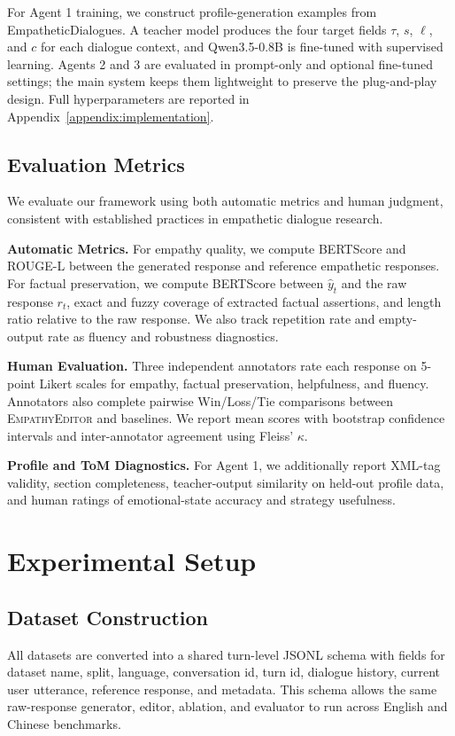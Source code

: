 \documentclass[11pt]{article}
\begin{document}
For Agent 1 training, we construct profile-generation examples from EmpatheticDialogues. A teacher model produces the four target fields $\tau$, $s$, $\ell$, and $c$ for each dialogue context, and Qwen3.5-0.8B is fine-tuned with supervised learning. Agents 2 and 3 are evaluated in prompt-only and optional fine-tuned settings; the main system keeps them lightweight to preserve the plug-and-play design. Full hyperparameters are reported in Appendix~\ref{appendix:implementation}.

\subsection{Evaluation Metrics}
\label{subsec:metrics}

We evaluate our framework using both automatic metrics and human judgment, consistent with established practices in empathetic dialogue research.

\textbf{Automatic Metrics.} For empathy quality, we compute BERTScore and ROUGE-L between the generated response and reference empathetic responses. For factual preservation, we compute BERTScore between $\hat{y}_t$ and the raw response $r_t$, exact and fuzzy coverage of extracted factual assertions, and length ratio relative to the raw response. We also track repetition rate and empty-output rate as fluency and robustness diagnostics.

\textbf{Human Evaluation.} Three independent annotators rate each response on 5-point Likert scales for empathy, factual preservation, helpfulness, and fluency. Annotators also complete pairwise Win/Loss/Tie comparisons between \textsc{EmpathyEditor} and baselines. We report mean scores with bootstrap confidence intervals and inter-annotator agreement using Fleiss' $\kappa$.

\textbf{Profile and ToM Diagnostics.} For Agent 1, we additionally report XML-tag validity, section completeness, teacher-output similarity on held-out profile data, and human ratings of emotional-state accuracy and strategy usefulness.
\section{Experimental Setup}
\label{sec:experimental_setup}

\subsection{Dataset Construction}

All datasets are converted into a shared turn-level JSONL schema with fields for dataset name, split, language, conversation id, turn id, dialogue history, current user utterance, reference response, and metadata. This schema allows the same raw-response generator, editor, ablation, and evaluator to run across English and Chinese benchmarks.
\end{document}
